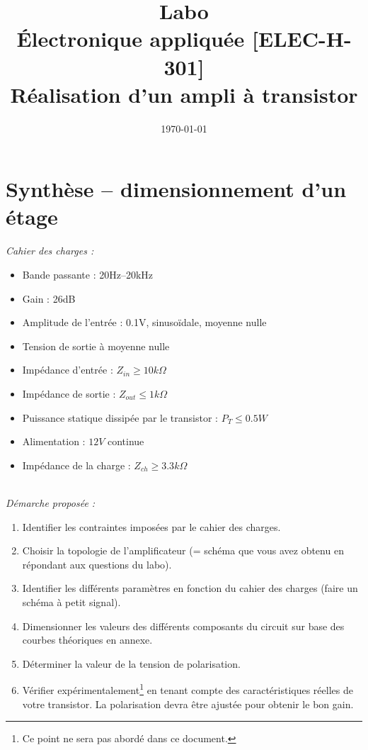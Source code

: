 \documentclass[11pt,a4paper]{article}
\date{\vspace{-1cm}\mydate\today}
\title{\vspace{-2cm} Labo \no 4\\ Électronique appliquée [ELEC-H-301]\\Réalisation d'un ampli à transistor\ifthenelse{\boolean{corrige}}{~\\Corrigé}{}}
\theoremstyle{definition}%
\begin{document}
%
\section{Synthèse -- dimensionnement d'un étage}

\textit{Cahier des charges :}
\begin{itemize}
\item Bande passante : 20Hz--20kHz
\item Gain : 26dB
\item Amplitude de l'entrée : 0.1V, sinusoïdale, moyenne nulle
\item Tension de sortie à moyenne nulle
\item Impédance d'entrée : $Z_{in}\geq10k\Omega$
\item Impédance de sortie : $Z_{out}\leq 1k\Omega$
\item Puissance statique dissipée par le transistor : $P_T\leq 0.5W$
\item Alimentation : $12V$ continue
\item Impédance de la charge : $Z_{ch}\geq 3.3k\Omega$
\end{itemize}


~\\
\textit{Démarche proposée :}
\begin{enumerate}
\item Identifier les contraintes imposées par le cahier des charges.
\item Choisir la topologie de l'amplificateur (= schéma que vous avez obtenu en répondant aux questions du labo).
\item Identifier les différents paramètres en fonction du cahier des charges (faire un schéma à petit signal).
\item Dimensionner les valeurs des différents composants du circuit sur base des courbes théoriques en annexe.
\item Déterminer la valeur de la tension de polarisation.
\item {Vérifier expérimentalement}\footnote{Ce point ne sera pas abordé dans ce document.} en tenant compte des caractéristiques réelles de votre transistor. La polarisation devra être ajustée pour obtenir le bon gain.
\end{enumerate}
\end{document}
